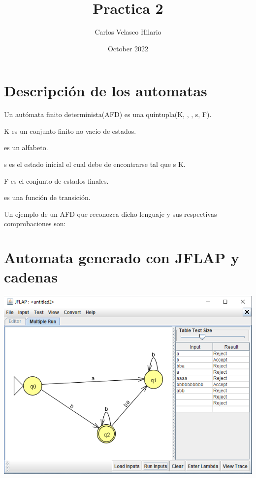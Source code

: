 \documentclass{article}
\title{Practica 2}
\author{Carlos Velasco Hilario}
\date{October 2022}
\begin{document}
\maketitle

\section{Descripción de los automatas}

Un autómata finito determinista(AFD) es una quíntupla(K, \sum, $$\delta, s, F).

K es un conjunto finito no vacío de estados.
\vspace{4mm}

\sum es un alfabeto.

\vspace{4mm}

s es el estado inicial el cual debe de encontrarse tal que s \in K.

\vspace{4mm}

F es el conjunto de estados finales.

\vspace{4mm}

\delta es una función de transición.

\vspace{4mm}

Un ejemplo de un AFD que reconozca dicho lenguaje y sus respectivas comprobaciones son:



\section{Automata generado con JFLAP y cadenas}
\begin{center}
\includegraphics[scale=0.4]{imagenautomata.png}
\end{center}
\newpage
\end{document}

